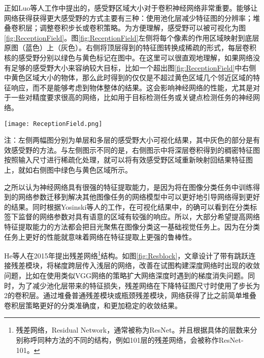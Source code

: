 正如Luo等人工作\cite{luo2016understanding}中提出的，感受野区域大小对于卷积神经网络非常重要。能够让网络获得获得更大感受野的方式主要有三种：使用池化层减少特征图的分辨率；堆叠卷积层；调整卷积步长或卷积策略。为方便理解，感受野可以被可视化为图\ref{fig:ReceptionField}。图\ref{fig:ReceptionField}左侧将每个像素的作用区域映射到底层原图（蓝色）上（灰色）。右侧将顶层得到的特征图转换成稀疏的形式，每层卷积核的感受野分别以绿色与黄色标记在图中。在这里可以很直观地理解，如果网络没有足够的感受野大小来容纳较大目标，比如一个超出图\ref{fig:ReceptionField}中右侧中黄色区域大小的物体，那么此时得到的仅仅是不超过黄色区域几个邻近区域的特征响应，而不是能够考虑到物体整体的结果。这会影响神经网络的性能，尤其是对于一些对精度要求很高的网络，比如用于目标检测任务或关键点检测任务的神经网络。

\begin{figure*}[htbp]	
	\centering
	\texttt{[image: ReceptionField.png]}
	\caption{两种可视化感受野的方法\cite{fang2017reception}}
	\begin{minipage}{0.8\textwidth}
		\wuhao
		注：左侧两幅图分别为单层和多层的感受野大小可视化结果，其中灰色的部分是有效感受野的方法。与左侧图示不同的是，右侧图示中将深层卷积得到的稠密特征图按照输入尺寸进行稀疏化处理，就可以将有效感受野区域重新映射回结果特征图上，就如右侧图中绿色与黄色区域所示。
	\end{minipage}
	\label{fig:ReceptionField}
\end{figure*}

之所以认为神经网络具有很强的特征提取能力，是因为将在图像分类任务中训练得到的网络参数迁移到解决其他图像任务的网络模型中可以更好地引导网络得到更好的结果\cite{mishkin2015all}。同时根据Yosinski等人的工作\cite{yosinski2015understanding}，在可视化结果中，的确可以看到在分类标签下监督的网络参数对具有语意的区域有较强的响应。所以，大部分希望提高网络特征提取能力的方法都会把目光聚焦在图像分类这一基础视觉任务上。因为在分类任务上更好的性能就意味着网络在特征提取上更强的鲁棒性。

He等人在2015年提出残差网络\footnote{残差网络，Residual Network，通常被称为ResNet。并且根据具体的层数来分别称呼同种方法的不同的结构，例如101层的残差网络，会被称作ResNet-101。}结构\cite{He2015Deep}。如图\ref{fig:Resblock}，文章设计了带有跳跃连接残差模块，将梯度跨层传入浅层的网络，改善在试图构建深度网络时出现的收敛问题，比如在使用类似VGG网络\cite{simonyan2014very}的策略扩大网络深度时遇到的梯度消失问题。同时，为了减少池化层带来的特征损失，残差网络在下降特征图尺寸时使用了步长为2的卷积层。通过堆叠普通残差模块或瓶颈残差模块，网络获得了比之前简单堆叠卷积层策略更好的分类准确度，和更加稳定的收敛结果。

